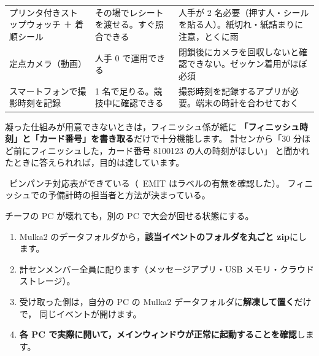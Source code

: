 \begin{center}
\small
\begin{tabular}{@{}P{34mm}P{50mm}P{56mm}@{}}
\toprule
{} &  &  \\
\midrule
プリンタ付きストップウォッチ ＋ 着順シール
  & その場でレシートを渡せる。すぐ照合できる
  & 人手が 2 名必要（押す人・シールを貼る人）。紙切れ・紙詰まりに注意，とくに雨 \\
定点カメラ（動画）
  & 人手 0 で運用できる
  & 閉鎖後にカメラを回収しないと確認できない。ゼッケン着用がほぼ必須 \\
スマートフォンで撮影時刻を記録
  & 1 名で足りる。競技中に確認できる
  & 撮影時刻を記録するアプリが必要。端末の時計を合わせておく \\
\bottomrule
\end{tabular}
\end{center}

\begin{Note}[最低限これだけは]
凝った仕組みが用意できないときは，フィニッシュ係が紙に
\textbf{「フィニッシュ時刻」と「カード番号」を書き取る}だけで十分機能します。
計センから「30 分ほど前にフィニッシュした，カード番号 8100123 の人の時刻がほしい」
と聞かれたときに答えられれば，目的は達しています。
\end{Note}

\begin{Done}
\tSI\ ピンパンチ対応表ができている（\tEMIT\ EMIT はラベルの有無を確認した）。
フィニッシュでの予備計時の担当者と方法が決まっている。
\end{Done}


\begin{Goal}
チーフの PC が壊れても，別の PC で大会が回せる状態にする。
\end{Goal}

\begin{enumerate}
\item Mulka2 のデータフォルダから，\textbf{該当イベントのフォルダを丸ごと zip}にします。
\item 計センメンバー全員に配ります（メッセージアプリ・USB メモリ・クラウドストレージ）。
\item 受け取った側は，自分の PC の Mulka2 データフォルダに\textbf{解凍して置く}だけで，
      同じイベントが開けます。
\item \textbf{各 PC で実際に開いて，メインウィンドウが正常に起動することを確認}します。
\end{enumerate}

